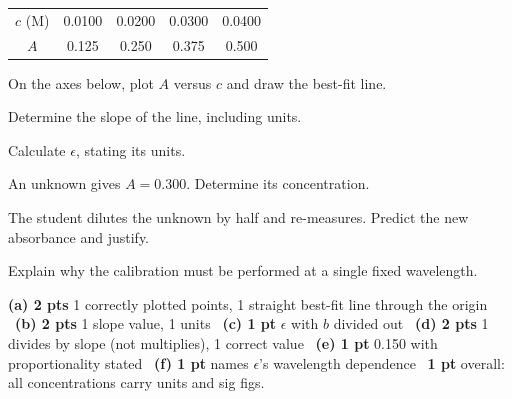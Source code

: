 \documentclass{apchem-worksheet}
\begin{document}
\renewcommand{\arraystretch}{1.25}
\begin{center}
\begin{tabular}{@{}ccccc@{}}
\toprule
$c$ (M) & 0.0100 & 0.0200 & 0.0300 & 0.0400\\
$A$ & 0.125 & 0.250 & 0.375 & 0.500\\
\bottomrule
\end{tabular}
\end{center}

\begin{parts}
  \item On the axes below, plot $A$ versus $c$ and draw the best-fit line.
        \workspace[4.6cm]
  \item Determine the slope of the line, including units.
  \item Calculate $\epsilon$, stating its units.
  \item An unknown gives $A = 0.300$. Determine its concentration.
  \item The student dilutes the unknown by half and re-measures. Predict the
        new absorbance and justify. 
  \item Explain why the calibration must be performed at a single fixed
        wavelength. 
\end{parts}

\begin{apcnote}
\textbf{(a) 2 pts} 1 correctly plotted points, 1 straight best-fit line
through the origin \textbullet\ \textbf{(b) 2 pts} 1 slope value, 1 units
\textbullet\ \textbf{(c) 1 pt} $\epsilon$ with $b$ divided out
\textbullet\ \textbf{(d) 2 pts} 1 divides by slope (not multiplies), 1
correct value \textbullet\ \textbf{(e) 1 pt} 0.150 with proportionality
stated \textbullet\ \textbf{(f) 1 pt} names $\epsilon$'s wavelength
dependence \textbullet\ \textbf{1 pt} overall: all concentrations carry
units and sig figs.
\end{apcnote}
\end{document}

